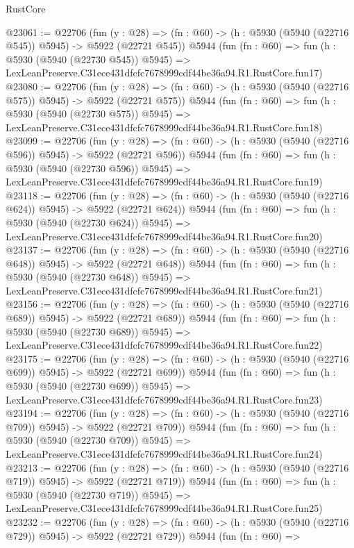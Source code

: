 \begin{lexlean}{RustCore}
\begin{coremodule}
@23061 := @22706
    (fun (y : @28) => (fn : @60) -> (h : @5930 (@5940 (@22716 @545)) @5945) -> @5922 (@22721 @545))
    @5944
    (fun (fn : @60) =>
    fun (h : @5930 (@5940 (@22730 @545)) @5945) =>
    LexLeanPreserve.C31ece431dfcfc7678999cdf44be36a94.R1.RustCore.fun17)
@23080 := @22706
    (fun (y : @28) => (fn : @60) -> (h : @5930 (@5940 (@22716 @575)) @5945) -> @5922 (@22721 @575))
    @5944
    (fun (fn : @60) =>
    fun (h : @5930 (@5940 (@22730 @575)) @5945) =>
    LexLeanPreserve.C31ece431dfcfc7678999cdf44be36a94.R1.RustCore.fun18)
@23099 := @22706
    (fun (y : @28) => (fn : @60) -> (h : @5930 (@5940 (@22716 @596)) @5945) -> @5922 (@22721 @596))
    @5944
    (fun (fn : @60) =>
    fun (h : @5930 (@5940 (@22730 @596)) @5945) =>
    LexLeanPreserve.C31ece431dfcfc7678999cdf44be36a94.R1.RustCore.fun19)
@23118 := @22706
    (fun (y : @28) => (fn : @60) -> (h : @5930 (@5940 (@22716 @624)) @5945) -> @5922 (@22721 @624))
    @5944
    (fun (fn : @60) =>
    fun (h : @5930 (@5940 (@22730 @624)) @5945) =>
    LexLeanPreserve.C31ece431dfcfc7678999cdf44be36a94.R1.RustCore.fun20)
@23137 := @22706
    (fun (y : @28) => (fn : @60) -> (h : @5930 (@5940 (@22716 @648)) @5945) -> @5922 (@22721 @648))
    @5944
    (fun (fn : @60) =>
    fun (h : @5930 (@5940 (@22730 @648)) @5945) =>
    LexLeanPreserve.C31ece431dfcfc7678999cdf44be36a94.R1.RustCore.fun21)
@23156 := @22706
    (fun (y : @28) => (fn : @60) -> (h : @5930 (@5940 (@22716 @689)) @5945) -> @5922 (@22721 @689))
    @5944
    (fun (fn : @60) =>
    fun (h : @5930 (@5940 (@22730 @689)) @5945) =>
    LexLeanPreserve.C31ece431dfcfc7678999cdf44be36a94.R1.RustCore.fun22)
@23175 := @22706
    (fun (y : @28) => (fn : @60) -> (h : @5930 (@5940 (@22716 @699)) @5945) -> @5922 (@22721 @699))
    @5944
    (fun (fn : @60) =>
    fun (h : @5930 (@5940 (@22730 @699)) @5945) =>
    LexLeanPreserve.C31ece431dfcfc7678999cdf44be36a94.R1.RustCore.fun23)
@23194 := @22706
    (fun (y : @28) => (fn : @60) -> (h : @5930 (@5940 (@22716 @709)) @5945) -> @5922 (@22721 @709))
    @5944
    (fun (fn : @60) =>
    fun (h : @5930 (@5940 (@22730 @709)) @5945) =>
    LexLeanPreserve.C31ece431dfcfc7678999cdf44be36a94.R1.RustCore.fun24)
@23213 := @22706
    (fun (y : @28) => (fn : @60) -> (h : @5930 (@5940 (@22716 @719)) @5945) -> @5922 (@22721 @719))
    @5944
    (fun (fn : @60) =>
    fun (h : @5930 (@5940 (@22730 @719)) @5945) =>
    LexLeanPreserve.C31ece431dfcfc7678999cdf44be36a94.R1.RustCore.fun25)
@23232 := @22706
    (fun (y : @28) => (fn : @60) -> (h : @5930 (@5940 (@22716 @729)) @5945) -> @5922 (@22721 @729))
    @5944
    (fun (fn : @60) =>

\end{coremodule}
\end{lexlean}

